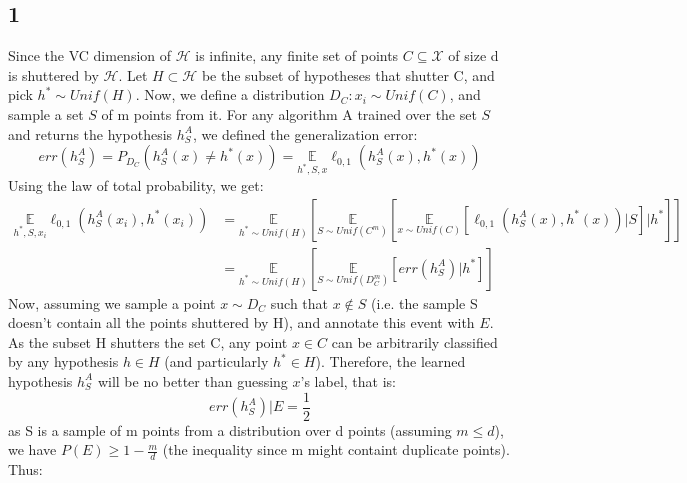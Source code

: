 \subsection*{1}
Since the VC dimension of $\mathcal{H}$ is infinite, any finite set of points $C \subseteq \mathcal{X} $ of size d is shuttered by $\mathcal{H}$. Let $H \subset \mathcal{H}$ be the subset of hypotheses that shutter C, and pick $h^* \sim Unif(H)$. Now, we define a distribution $D_C: x_i \sim Unif(C)$, and sample a set $S$ of m points from it. For any algorithm A trained over the set $S$ and returns the hypothesis $h_S^A$, we defined the generalization error:
\begin{equation*}
    \mathit{err}(h_S^A) = P_{D_C}(h_S^A(x) \neq h^*(x)) = \underset{h^*, S, x}{\mathbb{E}} \ell_{0,1}(h_S^A(x),h^*(x))
\end{equation*}
Using the law of total probability, we get:
\begin{equation*}
    \begin{split}        
        \underset{h^*, S, x_i}{\mathbb{E}} \ell_{0,1}(h_S^A(x_i),h^*(x_i)) &= \underset{h^* \sim Unif(H)}{\mathbb{E}} \left[\underset{S \sim Unif(C^m)}{\mathbb{E}} \left[\underset{x \sim Unif(C)}{\mathbb{E}} \left[\ell_{0,1}(h_S^A(x),h^*(x)) | S \right] | h^* \right] \right] \\
         &= \underset{h^* \sim Unif(H)}{\mathbb{E}} \left[\underset{S \sim Unif(D_C^m)}{\mathbb{E}}  \left[ \mathit{err}(h_S^A) | h^* \right] \right]
    \end{split}
\end{equation*}
Now, assuming we sample a point $x \sim D_C$ such that $x \notin S$ (i.e. the sample S doesn't contain all the points shuttered by H), and annotate this event with $E$. As the subset H shutters the set C, any point $x\in C$ can be arbitrarily classified by any hypothesis $h \in H$ (and particularly $h^*\in H$). Therefore, the learned hypothesis $h_S^A$ will be no better than guessing $x$'s label, that is:
\begin{equation*}
    \mathit{err}(h_S^A) | E = \frac{1}{2}
\end{equation*}
as S is a sample of m points from a distribution over d points (assuming $m \leq d$), we have $P(E) \geq 1 - \frac{m}{d}$ (the inequality since m might containt duplicate points). Thus:

